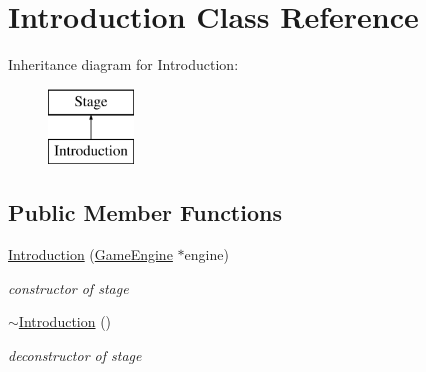 \hypertarget{class_introduction}{
\section{Introduction Class Reference}
\label{class_introduction}
}
Inheritance diagram for Introduction:\begin{figure}[H]
\begin{center}
\leavevmode
\includegraphics[height=2.000000cm]{class_introduction}
\end{center}
\end{figure}
\subsection*{Public Member Functions}
\begin{DoxyCompactItemize}
\item 
\hypertarget{class_introduction_abf9b6e30010fcf497299be5f65e9459b}{
\hyperlink{class_introduction_abf9b6e30010fcf497299be5f65e9459b}{Introduction} (\hyperlink{class_game_engine}{GameEngine} $\ast$engine)}
\label{class_introduction_abf9b6e30010fcf497299be5f65e9459b}

\begin{DoxyCompactList}\small\item\em constructor of stage \end{DoxyCompactList}\item 
\hypertarget{class_introduction_a059f5d2929c1bf75f2838b42ec6712e4}{
\hyperlink{class_introduction_a059f5d2929c1bf75f2838b42ec6712e4}{$\sim$Introduction} ()}
\label{class_introduction_a059f5d2929c1bf75f2838b42ec6712e4}

\begin{DoxyCompactList}\small\item\em deconstructor of stage \end{DoxyCompactList}\end{DoxyCompactItemize}
